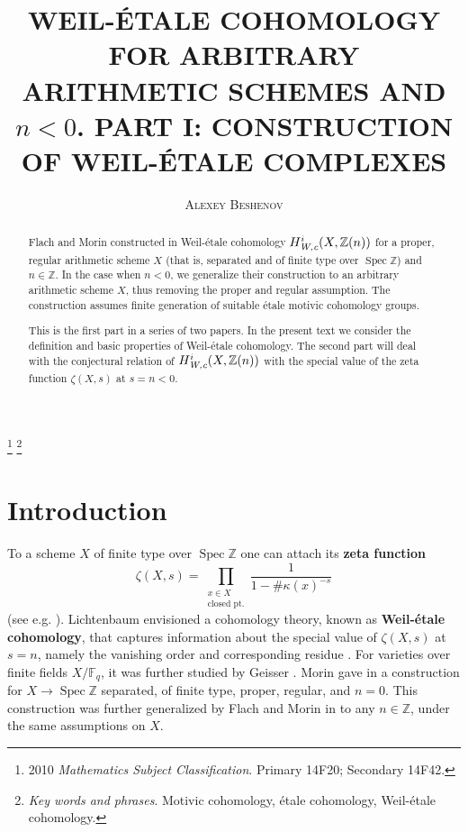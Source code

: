 \documentclass[leqno,12pt]{article}
\title{\uppercase{Weil-\'{e}tale cohomology for arbitrary arithmetic schemes and $n < 0$.
  Part I: Construction of Weil-\'{e}tale complexes}}
\author{\textsc{Alexey Beshenov}}
\date{}
\theoremstyle{plain}
\theoremstyle{definition}
\DeclareMathOperator{\Spec}{Spec}
\newcommand{\FF}{\mathbb{F}}
\newcommand{\ZZ}{\mathbb{Z}}
\newcommand{\Wc}{\text{\it W,c}}
\begin{document}
\maketitle

\footnote{ %
2010 \textit{Mathematics Subject Classification}.
Primary 14F20; Secondary 14F42.}
\footnote{ %
  \textit{Key words and phrases}.
  Motivic cohomology, étale cohomology, Weil-\'{e}tale cohomology.}


\begin{abstract}
  Flach and Morin constructed in \cite{Flach-Morin-2018} Weil-\'{e}tale
  cohomology $H^i_\Wc (X, \ZZ(n))$ for a proper, regular arithmetic
  scheme $X$ (that is, separated and of finite type over $\Spec \ZZ$) and
  $n \in \ZZ$. In the case when $n < 0$, we generalize their construction to an
  arbitrary arithmetic scheme $X$, thus removing the proper and regular
  assumption. The construction assumes finite generation of suitable \'{e}tale
  motivic cohomology groups.

  This is the first part in a series of two papers. In the present text we
  consider the definition and basic properties of Weil-\'{e}tale cohomology. The
  second part will deal with the conjectural relation of $H^i_\Wc (X, \ZZ(n))$
  with the special value of the zeta function $\zeta (X,s)$ at $s = n < 0$.
\end{abstract}

\section{Introduction}

To a scheme $X$ of finite type over $\Spec \ZZ$ one can attach its
\textbf{zeta function}
$$\zeta (X,s) = \prod_{\substack{x \in X \\ \text{closed pt.}}} \frac{1}{1 - \#\kappa (x)^{-s}}$$
(see e.g. \cite{Serre-1965}). Lichtenbaum envisioned a cohomology theory, known
as \textbf{Weil-\'{e}tale cohomology}, that captures information about the special
value of $\zeta (X,s)$ at $s = n$, namely the vanishing order and corresponding
residue
\cite{Lichtenbaum-2005,Lichtenbaum-2009-number-rings,Lichtenbaum-2009-Euler-char}.
For varieties over finite fields $X/\FF_q$, it was further studied by Geisser
\cite{Geisser-2004,Geisser-2006,Geisser-2010-arithmetic-homology}.
Morin gave in \cite{Morin-2014} a construction for $X \to \Spec\ZZ$ separated,
of finite type, proper, regular, and $n = 0$. This construction was further
generalized by Flach and Morin in \cite{Flach-Morin-2018} to any $n \in \ZZ$,
under the same assumptions on $X$.
\end{document}
